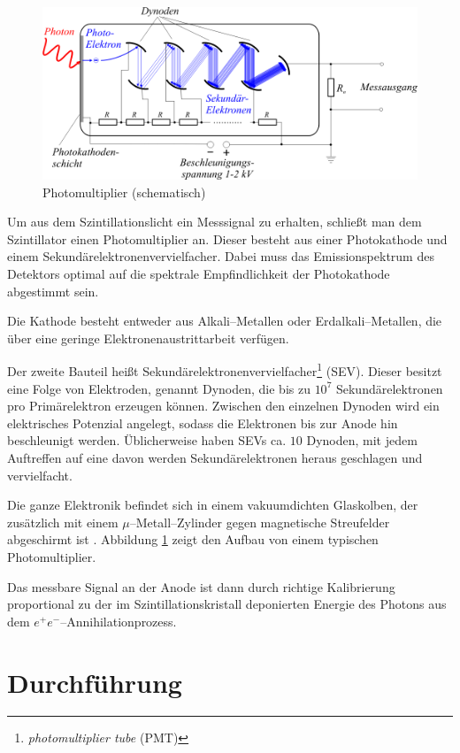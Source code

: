 \documentclass[12pt,a4paper]{scrartcl}
\numberwithin{equation}{section} %
\begin{document}
\begin{figure}[h]
	\centering
	\includegraphics{../media/B3.4/Photomultiplier_schema_de.png}
	\caption{Photomultiplier (schematisch) \cite{abb:Photomultiplier}}
	\label{abb:Photomultiplier}
\end{figure}

\noindent
Um aus dem Szintillationslicht ein Messsignal zu erhalten, schließt man dem Szintillator einen Photomultiplier an. Dieser besteht aus einer Photokathode und einem Sekundärelektronenvervielfacher. Dabei muss das Emissionspektrum des Detektors optimal auf die spektrale Empfindlichkeit der Photokathode abgestimmt sein.

Die Kathode besteht entweder aus Alkali--Metallen oder Erdalkali--Metallen, die über eine geringe Elektronenaustrittarbeit verfügen.

Der zweite Bauteil heißt Sekundärelektronenvervielfacher\footnote{\emph{photomultiplier tube} (PMT)} (SEV). Dieser besitzt eine Folge von Elektroden, genannt Dynoden, die bis zu $10^7$ Sekundärelektronen pro Primärelektron erzeugen können. Zwischen den einzelnen Dynoden wird ein elektrisches Potenzial angelegt, sodass die Elektronen bis zur Anode hin beschleunigt werden. Üblicherweise haben SEVs ca. $10$ Dynoden, mit jedem Auftreffen auf eine davon werden Sekundärelektronen heraus geschlagen und vervielfacht.

Die ganze Elektronik befindet sich in einem vakuumdichten Glaskolben, der zusätzlich mit einem $\mu$--Metall--Zylinder gegen magnetische Streufelder abgeschirmt ist \cite{LMU}. Abbildung \ref{abb:Photomultiplier} zeigt den Aufbau von einem typischen Photomultiplier.

Das messbare Signal an der Anode ist dann durch richtige Kalibrierung proportional zu der im Szintillationskristall deponierten Energie des Photons aus dem $e^+ e^-$--Annihilationprozess.

\clearpage
\hypertarget{durchfuxfchrung}{%
\section{Durchführung}\label{durchfuxfchrung}}
\end{document}
